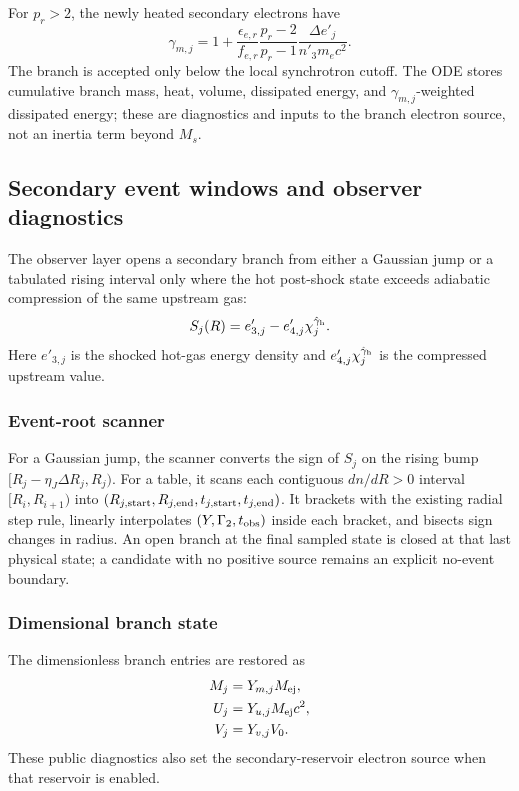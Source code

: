 \documentclass[twocolumn]{aastex702}
\begin{document}
For \(p_r>2\), the newly heated secondary electrons have
\begin{equation}
\gamma_{m,j}=1+
\frac{\epsilon_{e,r}}{f_{e,r}}
\frac{p_r-2}{p_r-1}
\frac{\Delta e'_j}{n'_3m_ec^2}.
\end{equation}
The branch is accepted only below the local synchrotron cutoff.  The ODE stores
cumulative branch mass, heat, volume, dissipated energy, and
\(\gamma_{m,j}\)-weighted dissipated energy; these are diagnostics and inputs to
the branch electron source, not an inertia term beyond \(M_s\).

\subsection{Secondary event windows and observer diagnostics}

The observer layer opens a secondary branch from either a Gaussian jump or a
tabulated rising interval only where the hot post-shock state exceeds adiabatic
compression of the same upstream gas:
\begin{equation}
S_j(R)=e'_{3,j}-e'_{4,j}\chi_j^{\hat\gamma_{\rm h}}.
\end{equation}
Here \(e'_{3,j}\) is the shocked hot-gas energy density and
\(e'_{4,j}\chi_j^{\hat\gamma_{\rm h}}\) is the compressed upstream value.

\subsubsection{Event-root scanner}

For a Gaussian jump, the scanner converts the sign of \(S_j\) on the rising bump
\([R_j-\eta_J\Delta R_j,R_j)\).  For a table, it scans each contiguous
\(dn/dR>0\) interval \([R_i,R_{i+1})\) into
\((R_{j,\rm start},R_{j,\rm end},t_{j,\rm start},t_{j,\rm end})\).  It brackets
with the existing radial step rule, linearly interpolates
\((Y,\Gamma_2,t_{\rm obs})\) inside each bracket, and bisects sign changes in
radius.  An open branch at the final sampled state is closed at that last
physical state; a candidate with no positive source remains an explicit no-event
boundary.

\subsubsection{Dimensional branch state}

The dimensionless branch entries are restored as
\begin{equation}
\begin{aligned}
M_j&=Y_{m,j}M_{\rm ej},\\
U_j&=Y_{u,j}M_{\rm ej}c^2,\\
V_j&=Y_{v,j}V_0.
\end{aligned}
\end{equation}
These public diagnostics also set the secondary-reservoir electron source when
that reservoir is enabled.
\end{document}
